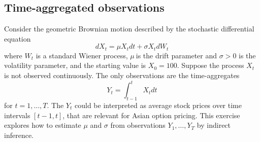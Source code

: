 \documentclass{article}
\begin{document}
\subsection{Time-aggregated observations}

Consider the geometric Brownian motion described by the stochastic
differential equation%
\begin{equation*}
dX_{t}=\mu X_{t}dt+\sigma X_{t}dW_{t}
\end{equation*}%
where $W_{t}$ is a standard Wiener process, $\mu \ $is the drift parameter
and $\sigma >0$ is the volatility parameter, and the starting value is $%
X_{0}=100$. Suppose the process $X_{t}$ is not observed continuously. The
only observations are the time-aggregates%
\begin{equation}
Y_{t}=\int_{t-1}^{t}X_{t}dt  \label{inty}
\end{equation}%
for $t=1,\ldots ,T$. The $Y_{t}$ could be interpreted as average stock
prices over time intervals $[t-1,t]$, that are relevant for Asian option
pricing. This exercise explores how to estimate $\mu $ and $\sigma $ from
observations $Y_{1},\ldots ,Y_{T}$ by indirect inference.
\end{document}

